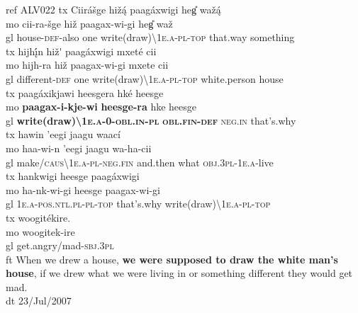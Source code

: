 \ea   \label{bouda:ex:ALV022}
ref ALV022
\glll 
tx Ciir\'a\v{s}ge hi\v{z}{\k{\'a}}  paag\'axwigi heg{\U} wa\v{z}{\k{\'a}}         \\    
mo cii-ra-\v{s}ge hi\v{z}{\A} paagax-wi-gi heg{\U} wa\v{z}{\A} \\ 
gl house-\textsc{def}-also one write(draw){\textbackslash}1\textsc{e.a}-\textsc{pl}-\textsc{top} that.way something  \\
\glll
tx hij{\A}h\k{\'{i}}n{\A} hi\v{z}\'{\A} paag\'axwigi m{\A}{\II}xet\'e cii          \\
mo  hij{\A}h{\II}-ra hi\v{z}{\A} paagax-wi-gi m{\A}{\II}xete cii                                          \\
gl different-\textsc{def} one write(draw){\textbackslash}1\textsc{e.a}-\textsc{pl}-\textsc{top} white.person house            \\
\glll
tx paag\'axikjawi  heesgera h{\A}{\A}k\'e heesge                                    \\           
mo \textbf{paagax-i-kje-wi} \textbf{heesge-ra} h{\A}{\A}ke heesge                     \\         
gl \textbf{write(draw){\textbackslash}1\textsc{e.a}-0-\textsc{obl}.\textsc{in}-\textsc{pl}} \textbf{\textsc{obl}.\textsc{fin}-\textsc{def}} \textsc{neg}.\textsc{in} that's.why\\ 
\glll
tx hawin{\II} 'eegi jaagu waac\'i          \\                                 
mo haa-wi-n{\II} 'eegi jaagu wa-ha-cii       \\                               
gl make/\textsc{caus}{\textbackslash}1\textsc{e.a}-\textsc{pl}-\textsc{neg}.\textsc{fin} and.then what \textsc{obj}.3\textsc{pl}-1\textsc{e.a}-live \\
\glll
tx han{\A}kwigi heesge paag\'axwigi      \\                                   
mo ha-n{\A}k-wi-gi heesge paagax-wi-gi     \\                                 
gl 1\textsc{e.a}-\textsc{pos}.\textsc{ntl}.\textsc{pl}-\textsc{pl}-\textsc{top} that's.why write(draw){\textbackslash}1\textsc{e.a}-\textsc{pl}-\textsc{top} \\
\glll
tx woogit\'ekire.\\
mo woogitek-ire \\
gl get.angry/mad-\textsc{sbj}.3\textsc{pl}\\
ft When we drew a house, \textbf{we were supposed to draw the white man's house}, if we drew what we were living in or something different they would get mad.\\
dt 23/Jul/2007\\
\z

